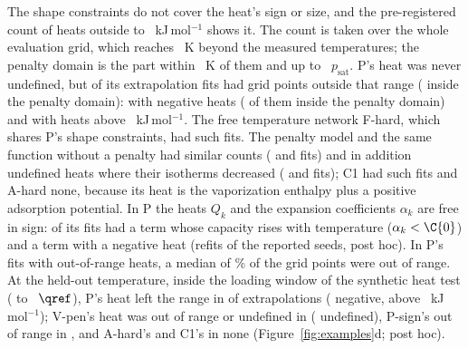 \documentclass[journal=jcisd8,manuscript=article]{achemso}
\begin{document}
The shape constraints do not cover the heat's sign or size, and the pre-registered count of heats outside
 to ~kJ\,mol$^{-1}$ shows it. The count is taken over the whole evaluation grid, which
reaches ~K beyond the measured temperatures; the penalty domain is the part within ~K of
them and up to ~$p_{\mathrm{sat}}$. P's heat was never undefined, but  of its
 extrapolation fits had grid points outside that range ( inside the penalty domain):
 with negative heats ( of them inside the penalty domain) and 
with heats above ~kJ\,mol$^{-1}$. The free temperature network F-hard, which shares P's shape
constraints, had  such fits. The penalty model and the same function without a penalty had similar counts
( and  fits) and in addition undefined heats where their isotherms decreased
( and  fits); C1 had  such fits and A-hard none, because its
heat is the vaporization enthalpy plus a positive adsorption potential. In P the heats $Q_k$ and the expansion
coefficients $\alpha_k$ are free in sign:  of its fits had a term whose capacity rises with
temperature ($\alpha_k < \C{0}$) and  a term with a negative heat (refits of the reported seeds,
post hoc). In P's fits with out-of-range heats, a median of \% of the grid points were out of range.
At the held-out temperature, inside the loading window of the synthetic heat test ( to
~$\qref$), P's heat left the range in  of  extrapolations
( negative,  above ~kJ\,mol$^{-1}$); V-pen's heat was out of range or
undefined in  ( undefined), P-sign's out of range in , and A-hard's and C1's
in none
(Figure~\ref{fig:examples}d; post hoc).
\end{document}
